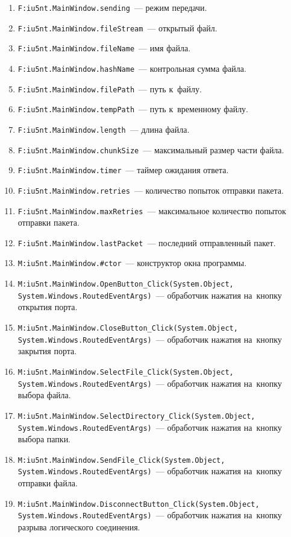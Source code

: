 \documentclass[a4paper,12pt]{article}
\begin{document}
\begin{enumerate}[noitemsep]
\item \texttt{F:iu5nt.MainWindow.sending}~--- режим передачи.
\item \texttt{F:iu5nt.MainWindow.fileStream}~--- открытый файл.
\item \texttt{F:iu5nt.MainWindow.fileName}~--- имя файла.
\item \texttt{F:iu5nt.MainWindow.hashName}~--- контрольная сумма файла.
\item \texttt{F:iu5nt.MainWindow.filePath}~--- путь к~файлу.
\item \texttt{F:iu5nt.MainWindow.tempPath}~--- путь к~временному файлу.
\item \texttt{F:iu5nt.MainWindow.length}~--- длина файла.
\item \texttt{F:iu5nt.MainWindow.chunkSize}~--- максимальный размер части файла.
\item \texttt{F:iu5nt.MainWindow.timer}~--- таймер ожидания ответа.
\item \texttt{F:iu5nt.MainWindow.retries}~--- количество попыток отправки пакета.
\item \texttt{F:iu5nt.MainWindow.maxRetries}~--- максимальное количество попыток отправки пакета.
\item \texttt{F:iu5nt.MainWindow.lastPacket}~--- последний отправленный пакет.
\item \texttt{M:iu5nt.MainWindow.\#ctor}~--- конструктор окна программы.
\item \texttt{M:iu5nt.MainWindow.OpenButton\_Click(System.Object,\\System.Windows.RoutedEventArgs)}~--- обработчик нажатия на~кнопку открытия порта.
\item \texttt{M:iu5nt.MainWindow.CloseButton\_Click(System.Object,\\System.Windows.RoutedEventArgs)}~--- обработчик нажатия на~кнопку закрытия порта.
\item \texttt{M:iu5nt.MainWindow.SelectFile\_Click(System.Object,\\System.Windows.RoutedEventArgs)}~--- обработчик нажатия на~кнопку выбора файла.
\item \texttt{M:iu5nt.MainWindow.SelectDirectory\_Click(System.Object,\\System.Windows.RoutedEventArgs)}~--- обработчик нажатия на~кнопку выбора папки.
\item \texttt{M:iu5nt.MainWindow.SendFile\_Click(System.Object,\\System.Windows.RoutedEventArgs)}~--- обработчик нажатия на~кнопку отправки файла.
\item \texttt{M:iu5nt.MainWindow.DisconnectButton\_Click(System.Object,\\System.Windows.RoutedEventArgs)}~--- обработчик нажатия на~кнопку разрыва логического соединения.

\end{enumerate}
\end{document}
